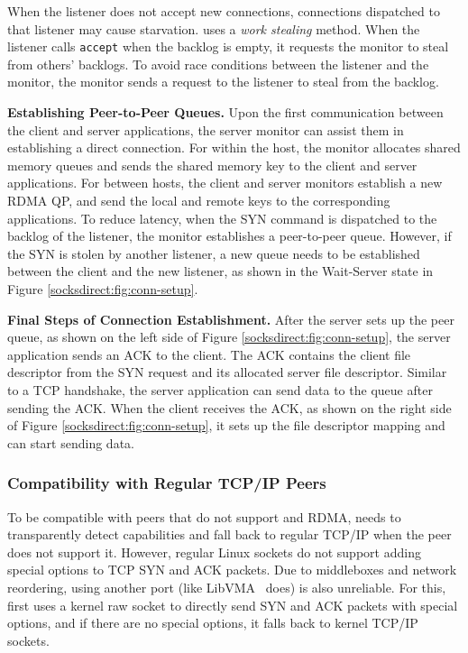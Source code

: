 When the listener does not accept new connections, connections dispatched to that listener may cause starvation. \sys{} uses a \emph{work stealing} method. When the listener calls \texttt{accept} when the backlog is empty, it requests the monitor to steal from others' backlogs. To avoid race conditions between the listener and the monitor, the monitor sends a request to the listener to steal from the backlog.

\textbf{Establishing Peer-to-Peer Queues.}
Upon the first communication between the client and server applications, the server monitor can assist them in establishing a direct connection. For within the host, the monitor allocates shared memory queues and sends the shared memory key to the client and server applications. For between hosts, the client and server monitors establish a new RDMA QP, and send the local and remote keys to the corresponding applications. To reduce latency, when the SYN command is dispatched to the backlog of the listener, the monitor establishes a peer-to-peer queue. However, if the SYN is stolen by another listener, a new queue needs to be established between the client and the new listener, as shown in the Wait-Server state in Figure \ref{socksdirect:fig:conn-setup}.

\textbf{Final Steps of Connection Establishment.}
After the server sets up the peer queue, as shown on the left side of Figure \ref{socksdirect:fig:conn-setup}, the server application sends an ACK to the client. The ACK contains the client file descriptor from the SYN request and its allocated server file descriptor. Similar to a TCP handshake, the server application can send data to the queue after sending the ACK. When the client receives the ACK, as shown on the right side of Figure \ref{socksdirect:fig:conn-setup}, it sets up the file descriptor mapping and can start sending data.

\subsubsection{Compatibility with Regular TCP/IP Peers}

To be compatible with peers that do not support \sys{} and RDMA, \sys{} needs to transparently detect \sys{} capabilities and fall back to regular TCP/IP when the peer does not support it. However, regular Linux sockets do not support adding special options to TCP SYN and ACK packets. Due to middleboxes and network reordering, using another port (like LibVMA~\cite{libvma} does) is also unreliable. For this, \libipc{} first uses a kernel raw socket to directly send SYN and ACK packets with special options, and if there are no special options, it falls back to kernel TCP/IP sockets.

